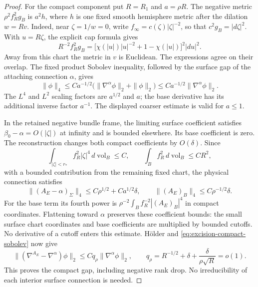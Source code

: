 \documentclass[11pt]{amsart}
\theoremstyle{definition}
\theoremstyle{remark}
\theoremstyle{plain}
\begin{document}
\begin{proof}
For the compact component put $R=R_1$ and $a=\rho R$.
The negative metric $\rho^2f_R^2g_B$ is $a^2h$, where $h$
is one fixed smooth hemisphere metric after the dilation $w=Rv$.
Indeed, near $\zeta=1/w=0$, write
$f_\infty=c(\zeta)|\zeta|^{-2}$, so that
$c^2g_B=|d\zeta|^2$. With $u=R\zeta$, the explicit cap formula gives
\begin{equation}\label{eq:excision-rescaled-cap-metric}
 R^{-2}f_R^2g_B
   =\bigl[\chi(|u|)|u|^{-2}+1-\chi(|u|)\bigr]^2|du|^2.
\end{equation}
Away from this chart the metric in $v$ is Euclidean.
The expressions agree on their overlap.
The fixed product Sobolev inequality, followed by the surface
gap of the attaching connection $\alpha$, gives
\begin{equation}\label{eq:excision-compact-sobolev}
 \|\phi\|_4
 \leq Ca^{-1/2}
            \bigl(\|\nabla^\alpha\phi\|_2+\|\phi\|_2\bigr)
 \leq Ca^{-1/2}\|\nabla^\alpha\phi\|_2 .
\end{equation}
The $L^4$ and $L^2$ scaling factors are $a^{1/2}$ and $a$;
the base derivative has its additional inverse factor $a^{-1}$.
The displayed coarser estimate is valid for $a\leq1$.

In the retained negative bundle frame, the limiting surface
coefficient satisfies $\beta_0-\alpha=O(|\zeta|)$ at infinity
and is bounded elsewhere. Its base coefficient is zero.
The reconstruction changes both compact coefficients by
$O(\delta)$. Since
\[
 \int_{|\zeta|<r_*} f_R^2|\zeta|^4\,d\operatorname{vol}_B\leq C,
 \qquad
 \int_B f_R^2\,d\operatorname{vol}_B\leq CR^2,
\]
with a bounded contribution from the remaining fixed chart,
the physical connection satisfies
\begin{equation}\label{eq:excision-compact-coefficients}
 \|(A_E-\alpha)_\Sigma\|_4
          \leq C\rho^{1/2}+Ca^{1/2}\delta,\qquad
 \|(A_E)_B\|_4\leq C\rho^{-1/2}\delta.
\end{equation}
For the base term its fourth power is
$\rho^{-2}\int_B f_R^{-2}|(A_E)_B|^4$
in compact coordinates. Flattening toward $\alpha$ preserves
these coefficient bounds: the small surface chart coordinates
and base coefficients are multiplied by bounded cutoffs.
No derivative of a cutoff enters this estimate.
H\"older and \eqref{eq:excision-compact-sobolev} now give
\begin{equation}\label{eq:excision-compact-form-smallness}
 \|(\nabla^{A_E}-\nabla^\alpha)\phi\|_2
       \leq Cq_\rho\|\nabla^\alpha\phi\|_2,\qquad
 q_\rho=R^{-1/2}+\delta+\frac{\delta}{\rho\sqrt R}=o(1).
\end{equation}
This proves the compact gap, including negative rank drop.
No irreducibility of each interior surface connection is needed.


\end{proof}
\end{document}
